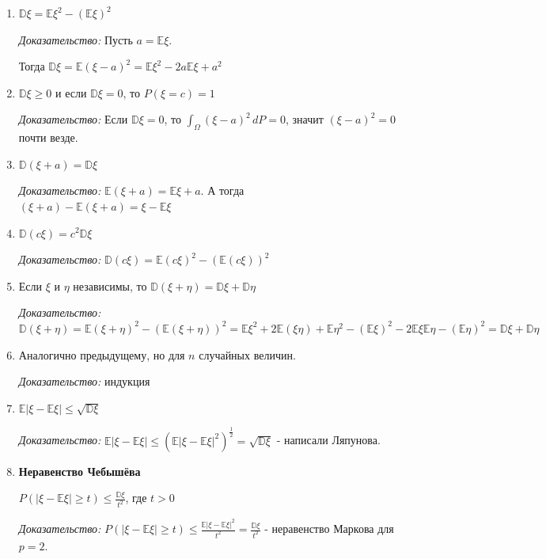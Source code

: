 \begin{properties}
    \begin{enumerate}
        \item {
            $\mathbb{D} \xi = \mathbb{E} \xi^2 - (\mathbb{E} \xi)^2$

            \textit{Доказательство: } Пусть $a = \mathbb{E} \xi$.

            Тогда $\mathbb{D} \xi = \mathbb{E} (\xi - a)^2 = \mathbb{E} \xi^2 - 2a\mathbb{E}\xi + a^2$
        }
        \item {
            $\mathbb{D} \xi \geqslant 0$ и если $\mathbb{D} \xi = 0$, то $P(\xi = c) = 1$

            \textit{Доказательство: } Если $\mathbb{D} \xi = 0$, то
            $\int_{\Omega} (\xi - a)^2 \, dP = 0$, значит $(\xi - a)^2 = 0$ почти везде.
        }
        \item {
            $\mathbb{D} (\xi + a) = \mathbb{D} \xi$

            \textit{Доказательство: } $\mathbb{E} (\xi + a) = \mathbb{E} \xi + a$. А тогда
            $(\xi + a) - \mathbb{E} (\xi + a) = \xi - \mathbb{E} \xi$
        }
        \item {
            $\mathbb{D} (c \xi) = c^2 \mathbb{D} \xi$

            \textit{Доказательство: } $\mathbb{D} (c\xi) = \mathbb{E} (c\xi)^2 - (\mathbb{E} (c\xi))^2$
        }
        \item {
            Если $\xi$ и $\eta$ независимы, то $\mathbb{D} (\xi + \eta) = \mathbb{D}\xi + \mathbb{D} \eta$

            \textit{Доказательство: } $\mathbb{D} (\xi + \eta) = \mathbb{E} (\xi + \eta)^2 - (\mathbb{E} (\xi + \eta))^2 =
            \mathbb{E} \xi^2 + 2\mathbb{E}(\xi \eta) + \mathbb{E} \eta^2 - (\mathbb{E}\xi)^2 - 2\mathbb{E}\xi\mathbb{E}\eta - (\mathbb{E}\eta)^2 = \mathbb{D} \xi + \mathbb{D} \eta$
        }
        \item {
            Аналогично предыдущему, но для $n$ случайных величин.

            \textit{Доказательство: } индукция
        }
        \item {
            $\mathbb{E} |\xi - \mathbb{E} \xi| \leqslant \sqrt{\mathbb{D} \xi}$

            \textit{Доказательство: } $\mathbb{E} |\xi - \mathbb{E} \xi| \leqslant (\mathbb{E}|\xi - \mathbb{E}\xi|^2)^{\frac{1}{2}} = \sqrt{\mathbb{D} \xi}$ - написали Ляпунова.
        }
        \item {
            \textbf{Неравенство Чебышёва}

            $P(|\xi - \mathbb{E} \xi| \geqslant t) \leqslant \frac{\mathbb{D} \xi}{t^2}$, где $t > 0$

            \textit{Доказательство: } $P(|\xi - \mathbb{E} \xi| \geqslant t) \leqslant \frac{\mathbb{E} |\xi - \mathbb{E} \xi|^2}{t^2} = \frac{\mathbb{D}\xi}{t^2}$ - неравенство Маркова для $p = 2$.
        }
    \end{enumerate}
\end{properties}

